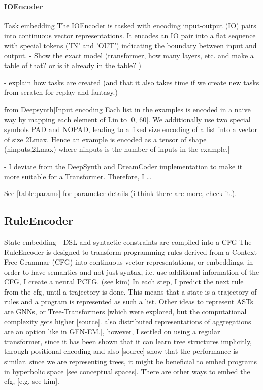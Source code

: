 \paragraph{IOEncoder}
Task embedding 
The IOEncoder is tasked with encoding input-output (IO) pairs into continuous vector representations.
It encodes an IO pair into a flat sequence with special tokens ('IN' and 'OUT') indicating the boundary between input and output.
- Show the exact model (transformer, how many layers, etc. and make a table of that? or is it already in the table? )

- explain how tasks are created (and that it also takes time if we create new tasks from scratch for replay and fantasy.)

from Deepsynth[Input encoding Each list in the examples is encoded in a naive way by mapping each element of Lin to [0, 60]. We additionally use two special symbols PAD and NOPAD, leading to a fixed size encoding of a list into a vector of size 2Lmax. Hence an example is encoded as a tensor of shape (ninputs,2Lmax) where ninputs is the number of inputs in the example.]

- I deviate from the DeepSynth and DreamCoder implementation to make it more suitable for a Transformer.
Therefore, I \dots


See \ref{table:params} for parameter details (i think there are more, check it.). 



\subsection{RuleEncoder}
State embedding
- DSL and syntactic constraints are compiled into a CFG
The RuleEncoder is designed to transform programming rules derived from a Context-Free Grammar (CFG) into continuous vector representations, or embeddings.
in order to have semantics and not just syntax, i.e. use additional information of the CFG, I create a neural PCFG. (see kim)
In each step, I predict the next rule from the cfg, until a trajectory is done. This means that a state is a trajectory of rules and a program is represented as such a list.
Other ideas to represent ASTs are GNNs, or Tree-Transformers [which were explored, but the computational complexity gets higher [source]. also distributed representations of aggregations are an option like in GFN-EM.], however, I settled on using a regular transformer, since it has been shown that it can learn tree structures implicitly, through positional encoding and also [source] show that the performance is similar.
since we are representing trees, it might be beneficial to embed programs in hyperbolic space [see conceptual spaces]. 
There are other ways to embed the cfg, [e.g. see kim].


